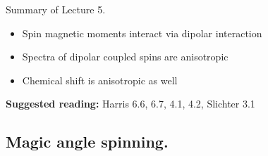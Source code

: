 \documentclass[handout]{beamer}
\begin{document}
\begin{frame}{Summary of Lecture 5.}
     \begin{itemize}
     	\item 	Spin magnetic moments interact via dipolar interaction
     	\item Spectra of dipolar coupled spins are anisotropic
     	\item Chemical shift is anisotropic as well
     \end{itemize}
     
     \textbf{Suggested reading:}  Harris 6.6, 6.7, 4.1, 4.2, Slichter 3.1
\end{frame}

\subsection{Magic angle spinning.}
\end{document}
